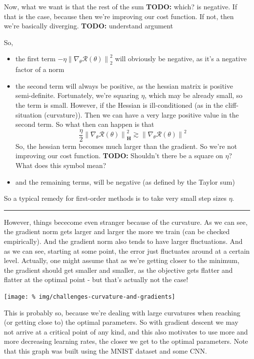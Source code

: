 \documentclass[a2paper,8pt]{extarticle}
\newcommand{\cR}{\mathcal{R}}
\newcommand{\norm}[1]{\left\lVert #1 \right\rVert}
\newcommand{\mat}[1]{\mathbf{#1}}
\newcommand{\MH}{\mat{H}}
\newcommand{\todo}[1]{\textbf{TODO:} #1}
\newcommand{\todo}[1]{%
}
\newcommand{\sep}{\vspace{0pt}\noindent\hrule\vspace{0pt}}
\newcommand{\sep}{\vspace{5pt}\noindent\hrule\vspace{5pt}}
\begin{document}
\begin{landscape}
\begin{multicols*}{7}
Now, what we want is that the rest of the sum \todo{which?} is negative. If that
is the case, because then we're improving our cost function. If not, then we're
basically diverging. \todo{understand argument}

So,
\begin{itemize}
  \item the first term $-\eta\norm{\nabla_\theta\cR(\theta)}_2^2$ will obviously
  be negative, as it's a negative factor of a norm
  \item the second term will always be positive, as the hessian matrix is
  positive semi-definite. Fortunately, we're squaring $\eta$, which may be
  already small, so the term is small. However, if the Hessian is
  ill-conditioned (as in the cliff-situation (curvature)). Then we can have a
  very large positive value in the second term. So what then can happen is that
  \[
  \frac{\eta}{2}\norm{\nabla_\theta\cR(\theta)}_{\MH}^2
  \gtrsim
  \norm{\nabla_\theta\cR(\theta)}^2
  \]
  So, the hessian term becomes much larger than the gradient. So we're not
  improving our cost function.
  \todo{Shouldn't there be a square on $\eta$? What does this symbol mean?}
  \item and the remaining terms, will be negative (as defined by the Taylor sum)
\end{itemize}

So a typical remedy for first-order methods is to take very small step sizes
$\eta$.

\sep

However, things bececome even stranger because of the curvature. As we can see,
the gradient norm gets larger and larger the more we train (can be checked
empirically). And the gradient norm also tends to have larger fluctuations. And
as we can see, starting at some point, the error just fluctuates around at a
certain level. Actually, one might assume that as we're getting closer to the
minimum, the gradient should get smaller and smaller, as the objective gets
flatter and flatter at the optimal point - but that's actually not the case!

\begin{center}
  \texttt{[image: \%
img/challenges-curvature-and-gradients]}
\end{center}

This is probably so, because we're dealing with large curvatures when reaching
(or getting close to) the optimal parameters. So with gradient descent we may
not arrive at a critical point of any kind, and this also motivates to use more
and more decreasing learning rates, the closer we get to the optimal parameters.
Note that this graph was built using the MNIST dataset and some CNN.


\end{multicols*}
\end{landscape}
\end{document}
